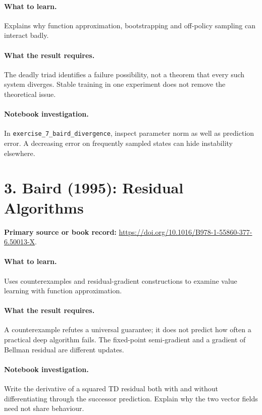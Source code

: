 \documentclass[11pt]{scrartcl}
\begin{document}
\paragraph{What to learn.} Explains why function approximation, bootstrapping and off-policy sampling can interact badly.

\paragraph{What the result requires.} The deadly triad identifies a failure possibility, not a theorem that every such system diverges. Stable training in one experiment does not remove the theoretical issue.

\paragraph{Notebook investigation.} In \texttt{exercise\_7\_baird\_divergence}, inspect parameter norm as well as prediction error. A decreasing error on frequently sampled states can hide instability elsewhere.

\section*{3. Baird (1995): Residual Algorithms}
\textbf{Primary source or book record:} \url{https://doi.org/10.1016/B978-1-55860-377-6.50013-X}.

\paragraph{What to learn.} Uses counterexamples and residual-gradient constructions to examine value learning with function approximation.

\paragraph{What the result requires.} A counterexample refutes a universal guarantee; it does not predict how often a practical deep algorithm fails. The fixed-point semi-gradient and a gradient of Bellman residual are different updates.

\paragraph{Notebook investigation.} Write the derivative of a squared TD residual both with and without differentiating through the successor prediction. Explain why the two vector fields need not share behaviour.
\end{document}
